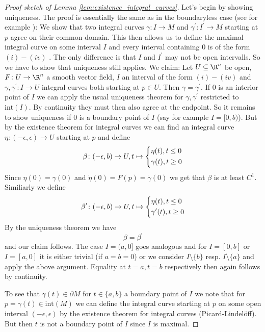 \begin{proof}[Proof sketch of Lemma \ref{lem:existence_integral_curves}] Let's begin by showing uniqueness. The proof is essentially the same as in the boundaryless case (see for example \cite{lee2011smooth}): We show that two integral curves $\gamma \colon I \to M$ and $\gamma^\prime \colon I^\prime \to M$ starting at $p$ agree on their common domain. This then allows us to define the maximal integral curve on some interval $I$ and every interval containing $0$ is of the form $(i) - (iv)$ \footnotemark. The only difference is that $I$ and $I^\prime$ may not be open intervalls. So we have to show that uniqueness still applies. We claim: Let $U \subseteq \R^n$ be open, $F \colon U \to \R^n$ a smooth vector field, $I$ an interval of the form $(i) - (iv)$ and $\gamma,\gamma^\prime \colon I \to U$ integral curves both starting at $p \in U$. Then $\gamma = \gamma^\prime$. If $0$ is an interior point of $I$ we can apply the usual uniqueness theorem for $\gamma,\gamma^\prime$ restricted to $\mathrm{int}(I)$. By continuity they must then also agree at the endpoint. So it remains to show uniqueness if $0$ is a boundary point of $I$ (say for example $I = [0,b)$). But by the existence theorem for integral curves we can find an integral curve $\eta \colon (-\epsilon,\epsilon) \to U$ starting at $p$ and define
\[
\beta \colon (-\epsilon,b) \to U, t \mapsto \begin{dcases*}
    \eta(t), t \leq 0 \\
    \gamma(t), t \geq 0
\end{dcases*}
\]
Since $\eta(0) = \gamma(0)$ and $\dot{\eta}(0) = F(p) = \dot{\gamma}(0)$ we get that $\beta$ is at least $C^1$. Similiarly we define
\[
\beta^\prime \colon (-\epsilon,b) \to U, t \mapsto \begin{dcases*}
    \eta(t), t \leq 0 \\
    \gamma^\prime(t), t \geq 0
\end{dcases*}
\]
By the uniqueness theorem we have
\[
\beta = \beta^\prime
\]
and our claim follows. The case $I = (a,0]$ goes analogous and for $I = [0,b]$ or $I = [a,0]$ it is either trivial (if $a = b = 0$) or we consider $I\setminus \{b\}$ resp. $I\setminus \{a\}$ and apply the above argument. Equality at $t = a, t = b$ respectively then again follows by continuity.

To see that $\gamma(t) \in \partial M$ for $t \in \{a,b\}$ a boundary point of $I$ we note that for $ p = \gamma(t) \in \mathrm{int}(M)$ we can define the integral curve starting at $p$ on some open interval $(-\epsilon,\epsilon)$ by the existence theorem for integral curves (Picard-Lindelöff). But then $t$ is not a boundary point of $I$ since $I$ is maximal.


\end{proof}
